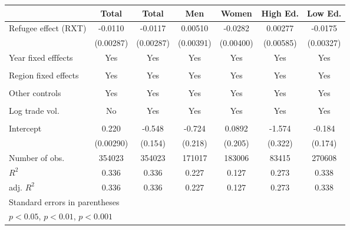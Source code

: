 \documentclass{article}
\begin{document}
{\begin{tabular}{l*{6}{c}}
&\multicolumn{1}{c}{Total}&\multicolumn{1}{c}{Total}&\multicolumn{1}{c}{Men}&\multicolumn{1}{c}{Women}&\multicolumn{1}{c}{High Ed.}&\multicolumn{1}{c}{Low Ed.}\\
\hline
Refugee effect (RXT)         &     -0.0110\sym{***}&     -0.0117\sym{***}&     0.00510         &     -0.0282\sym{***}&     0.00277         &     -0.0175\sym{***}\\
            &   (0.00287)         &   (0.00287)         &   (0.00391)         &   (0.00400)         &   (0.00585)         &   (0.00327)         \\
[1em]
Year fixed efffects         &       Yes&       Yes&             Yes&                    Yes&       Yes&       Yes\\
            &           &           &                     &                     &           &            \\
[1em]
Region fixed effects     &      Yes&      Yes&      Yes&     Yes&      Yes &     Yes\\
            &           &           &           &          &            &           \\
[1em]
Other controls       &      Yes&      Yes&     Yes&      Yes&     Yes&      Yes\\
            &          &           &          &            &           &            \\
[1em]
Log trade vol.   &                    No &     Yes&     Yes&            Yes&     Yes&      Yes  \\
            &                     &           &           &           &            &          \\
[1em]
Intercept      &       0.220\sym{***}&      -0.548\sym{***}&      -0.724\sym{***}&      0.0892         &      -1.574\sym{***}&      -0.184         \\
            &   (0.00290)         &     (0.154)         &     (0.218)         &     (0.205)         &     (0.322)         &     (0.174)         \\
\hline
Number of obs.       &      354023         &      354023         &      171017         &      183006         &       83415         &      270608         \\
\(R^{2}\)   &       0.336         &       0.336         &       0.227         &       0.127         &       0.273         &       0.338         \\
adj. \(R^{2}\)&       0.336         &       0.336         &       0.227         &       0.127         &       0.273         &       0.338         \\
\hline\hline
\multicolumn{7}{l}{\footnotesize Standard errors in parentheses}\\
\multicolumn{7}{l}{\footnotesize \sym{*} \(p<0.05\), \sym{**} \(p<0.01\), \sym{***} \(p<0.001\)}\\
\end{tabular}
}
\end{document}
